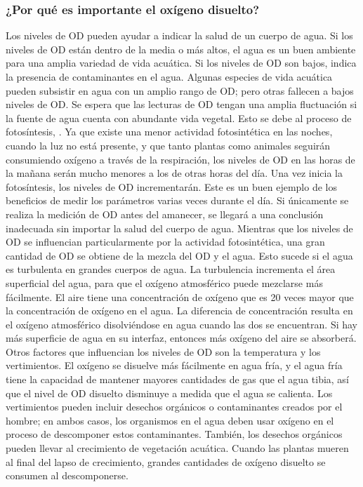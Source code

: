 \subsubsection{¿Por qu\'e es importante el oxígeno disuelto?}
Los niveles de OD pueden ayudar a indicar la salud de un cuerpo de agua. 
Si los niveles de OD están dentro de la media o más altos, el agua es un buen ambiente para una amplia variedad de vida acuática. 
Si los niveles de OD son bajos, indica la presencia de contaminantes en el agua. 
Algunas especies de vida acuática pueden subsistir en agua con un amplio rango de OD; pero otras fallecen a bajos niveles de OD.
Se espera que las lecturas de OD tengan una amplia fluctuación si la fuente de agua cuenta con abundante vida vegetal. Esto se debe al proceso de fotosíntesis, \cite{hannacolombia_guipara_nodate}. 
Ya que existe una menor actividad fotosintética en las noches, cuando la luz no está presente, y que tanto plantas como animales seguirán consumiendo oxígeno a través de la respiración, los niveles de OD en las horas de la mañana serán mucho menores a los de otras horas del día. 
Una vez inicia la fotosíntesis, los niveles de OD incrementarán. 
Este es un buen ejemplo de los beneficios de medir los parámetros varias veces durante el día. 
Si únicamente se realiza la medición de OD antes del amanecer, se llegará a una conclusión inadecuada sin importar la salud del cuerpo de agua.
Mientras que los niveles de OD se influencian particularmente por la actividad fotosintética, una gran cantidad de OD se obtiene de la mezcla del OD y el agua. 
Esto sucede si el agua es turbulenta en grandes cuerpos de agua. 
La turbulencia incrementa el área superficial del agua, para que el oxígeno atmosférico puede mezclarse más fácilmente. 
El aire tiene una concentración de oxígeno que es 20 veces mayor que la concentración de ox\'igeno en el agua. 
La diferencia de concentración resulta en el oxígeno atmosférico disolviéndose en agua cuando las dos se encuentran. 
Si hay más superficie de agua en su interfaz, entonces más oxígeno del aire se absorberá.
Otros factores que influencian los niveles de OD son la temperatura y los vertimientos. 
El ox\'igeno se disuelve más f\'acilmente en agua fría, y el agua fría tiene la capacidad de mantener mayores cantidades de gas que el agua tibia, así que el nivel de OD disuelto disminuye a medida que el agua se calienta.
Los vertimientos pueden incluir desechos orgánicos o contaminantes creados por el hombre; en ambos casos, los organismos en el agua deben usar oxígeno en el proceso de descomponer estos contaminantes.  
También, los desechos orgánicos pueden llevar al crecimiento de vegetación acuática.  
Cuando las plantas mueren al final del lapso de crecimiento, grandes cantidades de oxígeno disuelto se consumen al descomponerse.

